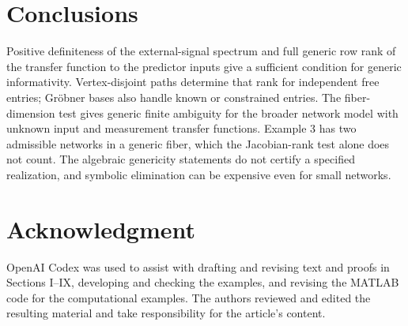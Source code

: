 \documentclass[journal,twoside,web]{ieeecolor}
\begin{document}
\section{Conclusions}
%
Positive definiteness of the external-signal spectrum and full generic row
rank of the transfer function to the predictor inputs give a sufficient
condition for generic informativity. Vertex-disjoint paths determine that
rank for independent free entries; Gröbner bases also handle known or
constrained entries. The fiber-dimension test gives generic finite ambiguity
for the broader network model with unknown input and measurement transfer functions.
Example 3 has two admissible networks in a generic fiber, which the
Jacobian-rank test alone does not count. The algebraic genericity statements
do not certify a specified realization, and symbolic elimination can be
expensive even for small networks.
%
\section*{Acknowledgment}
OpenAI Codex was used to assist with drafting and revising text and proofs
in Sections I--IX, developing and checking the examples, and revising the
MATLAB code for the computational examples. The authors reviewed and edited
the resulting material and take responsibility for the article's content.
%
\end{document}
